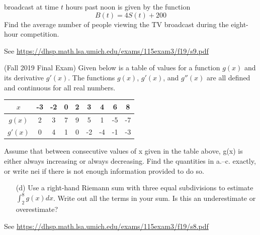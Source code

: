 \documentclass[11pt]{exam}
\begin{document}
\begin{questions}
\begin{parts}
    broadcast at time \(t\) hours past noon is given by the function \[
      B(t) = 4S(t)+200
    \]
    Find the average number of people viewing the TV broadcast during
    the eight-hour competition.
  \end{parts}
  \begin{solution}
    See \href{https://dhsp.math.lsa.umich.edu/exams/115exam3/f19/s9.pdf}{https://dhsp.math.lsa.umich.edu/exams/115exam3/f19/s9.pdf}
  \end{solution}
  \question (Fall 2019 Final Exam)
Given below is a table of values for a function \(g(x)\) and its derivative \(g'(x)\). The functions
\(g(x)\), \(g'(x)\), and \(g''(x)\) are all defined and continuous for all real numbers.
\vspace{-0.5cm}
\begin{center}
  \begin{tabular}{|c|c|c|c|c|c|c|c|c|}
    \hline
    \(x\)&-3&-2&0&2&3&4&6&8\\
    \hline
    \(g(x)\)&2&3&7&9&5&1&-5&-7\\
    \hline
    \(g'(x)\)&0&4&1&0&-2&-4&-1&-3\\
    \hline
  \end{tabular}
\end{center}
Assume that between consecutive values of x given in the table above, g(x) is either always increasing or always decreasing.
Find the quantities in a.–c. exactly, or write nei if there is not enough information provided to do
so.
\begin{multicols}{3}
\end{multicols}
\begin{enumerate}
\item[(d)] Use a right-hand Riemann sum with three equal subdivisions to
  estimate \(\int_2^8 g(x) dx\). Write out all the terms in your
  sum. Is this an underestimate or overestimate?
\end{enumerate}
\begin{solution}
  See \href{https://dhsp.math.lsa.umich.edu/exams/115exam3/f19/s8.pdf}{https://dhsp.math.lsa.umich.edu/exams/115exam3/f19/s8.pdf}
\end{solution}
\end{questions}
\end{document}
